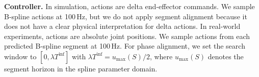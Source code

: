 \noindent\textbf{Controller.}
In simulation, actions are delta end-effector commands.
We sample B-spline actions at 100\,Hz, but we do not apply segment alignment because it does not have a clear physical interpretation for delta actions.
In real-world experiments, actions are absolute joint positions.
We sample actions from each predicted B-spline segment at 100\,Hz.
For phase alignment, we set the search window to $[0,\lambda T^{\mathrm{inf}}]$ with $\lambda T^{\mathrm{inf}} = u_{\max}(S)/2$, where $u_{\max}(S)$ denotes the segment horizon in the spline parameter domain.





